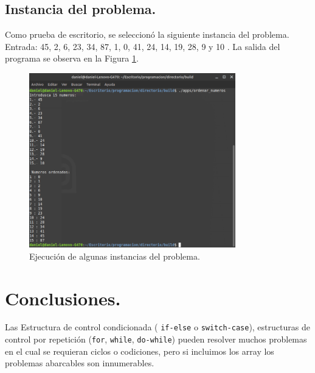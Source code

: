 \documentclass[12pt,letterpaper]{article}
\begin{document}
\subsection{Instancia del problema.}
Como prueba de escritorio, se seleccionó la siguiente instancia del problema. Entrada: 45, 2, 6, 23, 34, 87, 1, 0, 41, 24, 14, 19, 28, 9 y 10 . La salida del programa se observa en la Figura \ref{fig:ordenar_numeros}.
\begin{figure}[ht!]
  \centering
  \includegraphics[width=0.8\textwidth]{figures/ordenar_numeros}
  \caption{Ejecución de algunas instancias del problema.}
  \label{fig:ordenar_numeros}
\end{figure}

\newpage



\section{Conclusiones.}
Las Estructura de control condicionada ( \texttt{if-else} o \texttt{switch-case}), estructuras de control por repetici\'on (\texttt{for}, \texttt{while}, \texttt{do-while}) pueden resolver muchos problemas en el cual se requieran ciclos o codiciones, pero si incluimos los array los problemas abarcables son innumerables.

\printbibliography 
\end{document}
